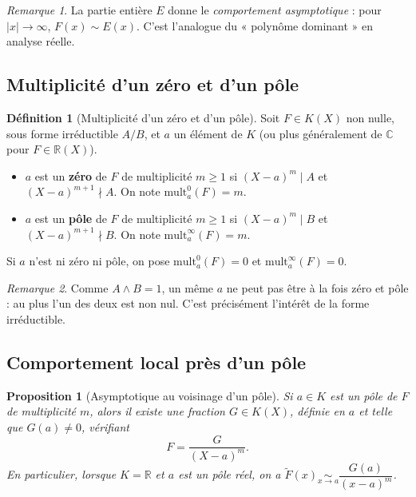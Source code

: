 \documentclass[12pt,a4paper]{report}
\newtheorem{proposition}[theoreme]{Proposition}
\theoremstyle{definition}
\newtheorem{definition}{Définition}[section]
\theoremstyle{remark}
\newtheorem{remarque}{Remarque}[section]
\begin{document}
\begin{remarque}
La partie entière $E$ donne le \emph{comportement asymptotique} : pour $|x| \to \infty$, $F(x) \sim E(x)$. C'est l'analogue du « polynôme dominant » en analyse réelle.
\end{remarque}

\subsection{Multiplicité d'un zéro et d'un pôle}

\begin{definition}[Multiplicité d'un zéro et d'un pôle]
Soit $F \in K(X)$ non nulle, sous forme irréductible $A/B$, et $a$ un élément de $K$ (ou plus généralement de $\mathbb{C}$ pour $F \in \mathbb{R}(X)$).
\begin{itemize}
    \item $a$ est un \textbf{zéro} de $F$ de multiplicité $m \ge 1$ si $(X - a)^m \mid A$ et $(X - a)^{m+1} \nmid A$. On note $\mathrm{mult}^0_a(F) = m$.
    \item $a$ est un \textbf{pôle} de $F$ de multiplicité $m \ge 1$ si $(X - a)^m \mid B$ et $(X - a)^{m+1} \nmid B$. On note $\mathrm{mult}^\infty_a(F) = m$.
\end{itemize}
Si $a$ n'est ni zéro ni pôle, on pose $\mathrm{mult}^0_a(F) = 0$ et $\mathrm{mult}^\infty_a(F) = 0$.
\end{definition}

\begin{remarque}
Comme $A \wedge B = 1$, un même $a$ ne peut pas être à la fois zéro et pôle : au plus l'un des deux est non nul. C'est précisément l'intérêt de la forme irréductible.
\end{remarque}

\subsection{Comportement local près d'un pôle}

\begin{proposition}[Asymptotique au voisinage d'un pôle]
Si $a \in K$ est un pôle de $F$ de multiplicité $m$, alors il existe une fraction $G \in K(X)$, définie en $a$ et telle que $G(a) \neq 0$, vérifiant
\[ F = \frac{G}{(X - a)^m}. \]
En particulier, lorsque $K = \mathbb{R}$ et $a$ est un pôle réel, on a $\widetilde{F}(x) \underset{x \to a}{\sim} \dfrac{G(a)}{(x - a)^m}$.
\end{proposition}
\end{document}
